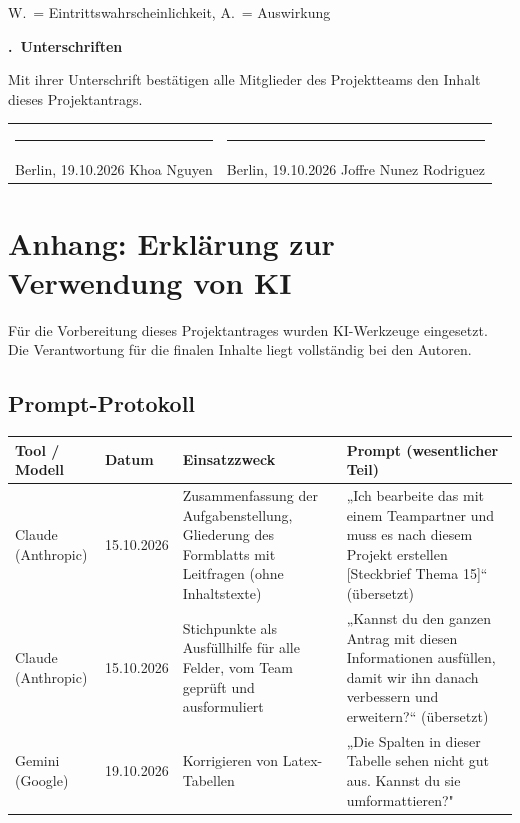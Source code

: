 \documentclass[11pt,a4paper]{article}
\newif\ifhinweise
\newcommand{\hinweis}[1]{\ifhinweise{\color{hinweisgrau}\small\itshape #1\par}\fi}
\newcounter{feldnr}
\newcommand{\formfeld}[1]{%
  \par\medskip\Needspace{6\baselineskip}\noindent
  \stepcounter{feldnr}%
  \colorbox{bhtgrau}{\parbox{\dimexpr\linewidth-2\fboxsep}{\textbf{\thefeldnr.\ #1}}}%
  \par\smallskip}
\begin{document}
\smallskip
{\small W.\ = Eintrittswahrscheinlichkeit, A.\ = Auswirkung}

\formfeld{Unterschriften}
Mit ihrer Unterschrift bestätigen alle Mitglieder des Projektteams den Inhalt dieses Projektantrags.

\vspace{1.2cm}
\begin{tabularx}{\linewidth}{XX}
\rule{0.9\linewidth}{0.4pt} & \rule{0.9\linewidth}{0.4pt} \\
Berlin, 19.10.2026 Khoa Nguyen & Berlin, 19.10.2026 Joffre Nunez Rodriguez \\
\end{tabularx}

\newpage
\section*{Anhang: Erklärung zur Verwendung von KI}

Für die Vorbereitung dieses Projektantrages wurden KI-Werkzeuge eingesetzt. Die Verantwortung für die finalen Inhalte liegt vollständig bei den Autoren.

\subsection*{Prompt-Protokoll}
\hinweis{Jede KI-Nutzung über Rechtschreib- und Grammatikprüfung hinaus eintragen. Die ersten Zeilen dokumentieren die Nutzung für diese Vorlage.}
\begin{tabularx}{\linewidth}{|p{2.6cm}|l|X|X|}
\hline
\rowcolor{bhtgrau}\textbf{Tool / Modell} & \textbf{Datum} & \textbf{Einsatzzweck} & \textbf{Prompt (wesentlicher Teil)} \\ \hline
Claude (Anthropic) & 15.10.2026 & Zusammenfassung der Aufgabenstellung, Gliederung des Formblatts mit Leitfragen (ohne Inhaltstexte) & „Ich bearbeite das mit einem Teampartner und muss es nach diesem Projekt erstellen [Steckbrief Thema 15]“ (übersetzt) \\ \hline
Claude (Anthropic) & 15.10.2026 & Stichpunkte als Ausfüllhilfe für alle Felder, vom Team geprüft und ausformuliert & „Kannst du den ganzen Antrag mit diesen Informationen ausfüllen, damit wir ihn danach verbessern und erweitern?“ (übersetzt) \\ \hline
Gemini (Google)    & 19.10.2026 & Korrigieren von Latex-Tabellen & „Die Spalten in dieser Tabelle sehen nicht gut aus. Kannst du sie umformattieren?" \\ \hline
\end{tabularx}
\end{document}
